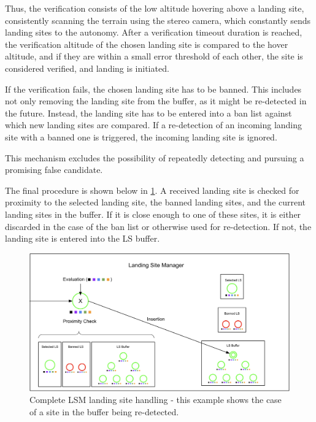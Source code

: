 Thus, the verification consists of the low altitude hovering above a landing site, consistently scanning the terrain using the stereo camera, which constantly sends landing sites to the autonomy. After a verification timeout duration is reached, the verification altitude of the chosen landing site is compared to the hover altitude, and if they are within a small error threshold of each other, the site is considered verified, and landing is initiated.

If the verification fails, the chosen landing site has to be banned. This includes not only removing the landing site from the buffer, as it might be re-detected in the future. Instead, the landing site has to be entered into a ban list against which new landing sites are compared. If a re-detection of an incoming landing site with a banned one is triggered, the incoming landing site is ignored. 

This mechanism excludes the possibility of repeatedly detecting and pursuing a promising false candidate.

The final procedure is shown below in \cref{fig:lsm_complete}. A received landing site is checked for proximity to the selected landing site, the banned landing sites, and the current landing sites in the buffer. If it is close enough to one of these sites, it is either discarded in the case of the ban list or otherwise used for re-detection. If not, the landing site is entered into the LS buffer. 

\begin{figure}[h]
\centering
\includegraphics[scale=0.2]{images/autonomous_landing/lsm_complete.png}
\caption{Complete LSM landing site handling - this example shows the case of a site in the buffer being re-detected.}
\label{fig:lsm_complete}
\end{figure}

\clearpage%

